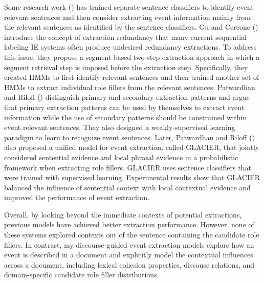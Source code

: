 Some research work (\cite{gu06,patwardhan-emnlp07,patwardhan-emnlp09}) 
has trained separate sentence classifiers to identify 
event relevant sentences and then consider  
extracting event information mainly from the relevant sentences as 
identified by the sentence classifiers.
Gu and Cercone (\cite{gu06}) 
introduce the concept of extraction
redundancy that many current sequential 
labeling IE systems often produce 
undesired redundancy extractions. 
To address this issue, they propose a segment based
two-step extraction approach in which a segment
retrieval step is imposed before the extraction
step.
Specifically, they created HMMs to first identify relevant
sentences and then trained another set of HMMs to extract individual
role fillers from the relevant sentences.
Patwardhan and Riloff (\cite{patwardhan-emnlp07})
distinguish primary and secondary extraction patterns and argue that 
primary extraction patterns can be used by 
themselves to extract event information while 
the use of secondary patterns should be constrained within
event relevant sentences. 
They also designed a
weakly-supervised learning paradigm to 
learn to recognize event sentences. 
Later, Patwardhan and Riloff (\cite{patwardhan-emnlp09}) also 
proposed a unified model for event extraction, called GLACIER, that jointly considered sentential
evidence and local phrasal evidence in a probabilistic framework when extracting
role fillers. 
GLACIER uses sentence classifiers that were 
trained with supervised learning. 
Experimental results show that GLACIER  
balanced the influence of 
sentential context with local contextual evidence 
and improved the performance of event extraction. 

Overall, by 
looking 
beyond 
the immediate contexts of potential extractions, 
previous 
models have achieved better extraction performance.
However, none of 
these systems 
explored contexts out of the sentence containing the candidate role fillers. 
In contrast, my discourse-guided event extraction models 
explore how an event is described in a document and 
explicitly model 
the contextual influences 
across a document, 
including lexical cohesion properties, discouse relations, 
and domain-specific candidate role filler distributions. 

